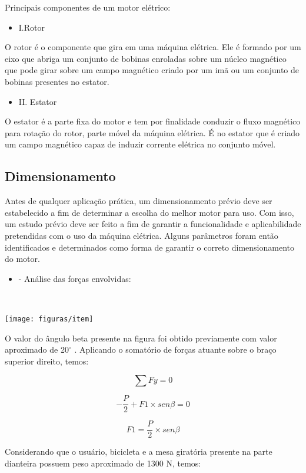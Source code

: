 Principais componentes de um motor elétrico: 

\begin{itemize}
\item 
I.Rotor
\end{itemize}
O rotor é o componente que gira em uma máquina elétrica. Ele é formado por um eixo que abriga um conjunto de bobinas enroladas sobre um núcleo magnético que pode girar sobre um campo magnético criado por um imã ou um conjunto de bobinas presentes no estator.
\begin{itemize}
\item 
II. Estator
\end{itemize}
O estator é a parte fixa do motor e tem por finalidade conduzir o fluxo magnético para rotação do rotor, parte móvel da máquina elétrica. É no estator que é criado um campo magnético capaz de induzir corrente elétrica no conjunto móvel.     

\subsection{Dimensionamento}

Antes de qualquer aplicação prática, um dimensionamento prévio deve ser estabelecido a fim de determinar a escolha do melhor motor para uso. Com isso, um estudo prévio deve ser feito a fim de garantir a funcionalidade e aplicabilidade pretendidas com o uso da máquina elétrica. Alguns parâmetros foram então identificados e determinados como forma de garantir o correto dimensionamento do motor.

\begin{itemize}
\item 
- Análise das forças envolvidas: 
\end{itemize}
                                                          
\begin{center}
\texttt{[image: figuras/item]}
\label{item}
\end{center}

O valor do ângulo beta presente na figura foi obtido previamente com valor aproximado de 20$^{\circ}$ . Aplicando o somatório de forças atuante sobre o braço superior direito, temos:

\[\sum Fy= 0\]

\[- \frac{P}{2} + F1\times  sen \beta  =  0\]

\[F1 = \frac{P}{2} \times sen \beta\]

Considerando que o usuário, bicicleta e a mesa giratória presente na parte dianteira possuem peso aproximado de 1300 N, temos: 

